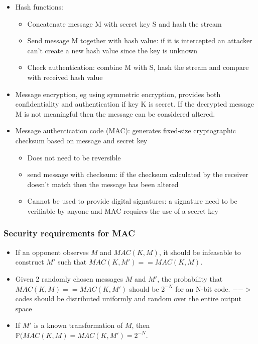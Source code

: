 \documentclass[12pt]{article}
\begin{document}
 \begin{itemize}
 	\item Hash functions:
 	\begin{itemize}
 		\item Concatenate message M with secret key S and hash the stream
 		\item Send message M together with hash value: if it is intercepted an attacker can't create a new hash value since the key is unknown
 		\item Check authentication: combine M with S, hash the stream and compare with received hash value
 	\end{itemize}
 	\item Message encryption, eg using symmetric encryption, provides both confidentiality and authentication if key K is secret. If the decrypted message M is not meaningful then the message can be considered altered.
 	\item Message authentication code (MAC): generates fixed-size cryptographic checksum based on message and secret key
 	\begin{itemize}
 		\item Does not need to be reversible
 		\item send message with checksum: if the checksum calculated by the receiver doesn't match then the message has been altered
 		\item Cannot be used to provide digital signatures: a signature need to be verifiable by anyone and MAC requires the use of a secret key
 	\end{itemize}
 \end{itemize}
 \subsubsection{Security requirements for MAC}
 \begin{itemize}
 	\item If an opponent observes $M$ and $MAC(K, M)$, it should be infeasable to construct $M'$ such that $MAC(K, M') == MAC(K, M)$.
 	\item Given 2 randomly chosen messages $M$ and $M'$, the probability that $MAC(K, M) == MAC(K, M')$ should be $2^{-N}$ for an N-bit code. $-->$ codes should be distributed uniformly and random over the entire output space
 	\item If $M'$ is a known transformation of $M$, then $\mathbb{P}(MAC(K, M) = MAC(K, M') = 2^{-N}$.
 \end{itemize}
\end{document}
